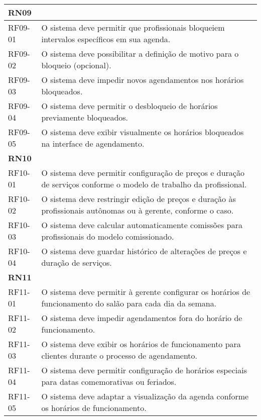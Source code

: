 \begin{longtable}{|p{}|p{}|}
	\multicolumn{2}{|l|}{\textbf{RN09}} \\ \hline
	RF09-01 & O sistema deve permitir que profissionais bloqueiem intervalos específicos em sua agenda. \\ \hline
	RF09-02 & O sistema deve possibilitar a definição de motivo para o bloqueio (opcional). \\ \hline
	RF09-03 & O sistema deve impedir novos agendamentos nos horários bloqueados. \\ \hline
	RF09-04 & O sistema deve permitir o desbloqueio de horários previamente bloqueados. \\ \hline
	RF09-05 & O sistema deve exibir visualmente os horários bloqueados na interface de agendamento. \\ \hline
	
	\multicolumn{2}{|l|}{\textbf{RN10}} \\ \hline
	RF10-01 & O sistema deve permitir configuração de preços e duração de serviços conforme o modelo de trabalho da profissional. \\ \hline
	RF10-02 & O sistema deve restringir edição de preços e duração às profissionais autônomas ou à gerente, conforme o caso. \\ \hline
	RF10-03 & O sistema deve calcular automaticamente comissões para profissionais do modelo comissionado. \\ \hline
	RF10-04 & O sistema deve guardar histórico de alterações de preços e duração de serviços. \\ \hline
	
	\multicolumn{2}{|l|}{\textbf{RN11}} \\ \hline
	RF11-01 & O sistema deve permitir à gerente configurar os horários de funcionamento do salão para cada dia da semana. \\ \hline
	RF11-02 & O sistema deve impedir agendamentos fora do horário de funcionamento. \\ \hline
	RF11-03 & O sistema deve exibir os horários de funcionamento para clientes durante o processo de agendamento. \\ \hline
	RF11-04 & O sistema deve permitir configuração de horários especiais para datas comemorativas ou feriados. \\ \hline
	RF11-05 & O sistema deve adaptar a visualização da agenda conforme os horários de funcionamento. \\ \hline
	

\end{longtable}

